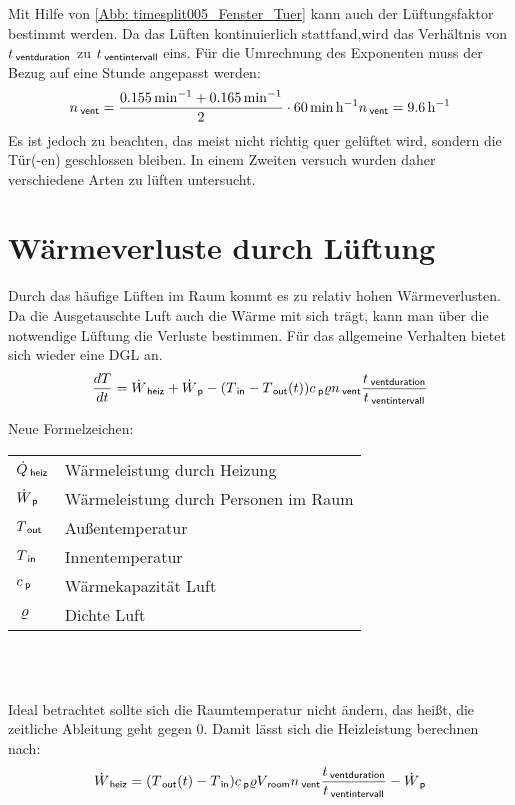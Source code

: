 \documentclass[12pt,a4paper,bibtotocnumbered,liststotocnumbered]{scrreprt}
\newenvironment{parameterNames}{Neue Formelzeichen:\\ \begin{tabular}{ll}}{\end{tabular} \\ \\}
\begin{document}
Mit Hilfe von \autoref{Abb: timesplit005_Fenster_Tuer} kann auch der Lüftungsfaktor bestimmt werden. Da das Lüften kontinuierlich stattfand,wird das Verhältnis von $t_{\: \mathsf{ventduration}}$ zu $t_{\: \mathsf{ventintervall}}$ eins. Für die Umrechnung des Exponenten muss der Bezug auf eine Stunde angepasst werden:
\begin{align}
n_{\: \mathsf{vent}} = \frac{\SI{0.155}{\per\minute} + \SI{0.165}{\per\minute}}{2} \cdot \SI{60}{\minute\per\hour}
n_{\: \mathsf{vent}} = \SI{9.6}{\per\hour}
\end{align}
Es ist jedoch zu beachten, das meist nicht richtig quer gelüftet wird, sondern die Tür(-en) geschlossen bleiben. In einem Zweiten versuch wurden daher verschiedene Arten zu lüften untersucht. \citep[S. 927]{recknagel2009taschenbuch}



\chapter{Wärmeverluste durch Lüftung}
Durch das häufige Lüften im Raum kommt es zu relativ hohen Wärmeverlusten. Da die Ausgetauschte Luft auch die Wärme mit sich trägt, kann man über die notwendige Lüftung die Verluste bestimmen. Für das allgemeine Verhalten bietet sich wieder eine DGL an.
\begin{align}
\frac{dT}{dt} = \dot{W}_{\: \mathsf{heiz}} + \dot{W}_{\: \mathsf{p}} - (T_{\: \mathsf{in}} - T_{\: \mathsf{out}}(t))c_{\: \mathsf{p}} \varrho n_{\: \mathsf{vent}}\frac{t_{\: \mathsf{ventduration}}}{t_{\: \mathsf{ventintervall}}}
\end{align}

\begin{parameterNames}
$\dot{Q}_{\: \mathsf{heiz}}$ & Wärmeleistung durch Heizung\\
$\dot{W}_{\: \mathsf{p}}$ & Wärmeleistung durch Personen im Raum\\
$T_{\: \mathsf{out}}$ & Außentemperatur\\
$T_{\: \mathsf{in}}$ & Innentemperatur\\
$c_{\: \mathsf{p}}$ & Wärmekapazität Luft\\
$\varrho$ & Dichte Luft 
\end{parameterNames}

Ideal betrachtet sollte sich die Raumtemperatur nicht ändern, das heißt, die zeitliche Ableitung geht gegen 0. Damit lässt sich die Heizleistung berechnen nach:
\begin{align}
\dot{W}_{\: \mathsf{heiz}} =(T_{\: \mathsf{out}}(t) - T_{\: \mathsf{in}}) c_{\: \mathsf{p}} \varrho V_{\: \mathsf{room}} n_{\: \mathsf{vent}} \frac{t_{\: \mathsf{ventduration}}}{t_{\: \mathsf{ventintervall}}} -  \dot{W}_{\: \mathsf{p}}
\end{align} 
\end{document}
